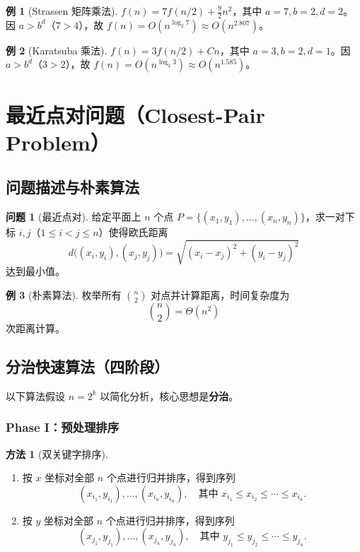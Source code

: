 \documentclass[UTF8,11pt,a4paper]{ctexbook}   %
\theoremstyle{definition}
\newtheorem{example}{例}[section]
\newtheorem{method}{方法}[section]
\newtheorem{problem}{问题}[section]
\begin{document}
\begin{example}[Strassen 矩阵乘法]
$f(n) = 7f(n/2) + \frac{9}{2}n^2$，其中 $a=7,b=2,d=2$。因 $a>b^d$（$7>4$），故 $f(n) = O(n^{\log_2 7}) \approx O(n^{2.807})$。
\end{example}

\begin{example}[Karatsuba 乘法]
$f(n) = 3f(n/2) + Cn$，其中 $a=3,b=2,d=1$。因 $a>b^d$（$3>2$），故 $f(n) = O(n^{\log_2 3}) \approx O(n^{1.585})$。
\end{example}

\section{最近点对问题（Closest-Pair Problem）}

\subsection{问题描述与朴素算法}

\begin{problem}[最近点对]
给定平面上 $n$ 个点 $P=\{(x_1,y_1),\dots,(x_n,y_n)\}$，求一对下标 $i,j$（$1\le i<j\le n$）使得欧氏距离
\[
d\bigl((x_i,y_i),(x_j,y_j)\bigr) = \sqrt{(x_i-x_j)^2+(y_i-y_j)^2}
\]
达到最小值。
\end{problem}

\begin{example}[朴素算法]
枚举所有 $\binom{n}{2}$ 对点并计算距离，时间复杂度为
\[
\binom{n}{2} = \Theta(n^2)
\]
次距离计算。
\end{example}

\subsection{分治快速算法（四阶段）}

以下算法假设 $n=2^k$ 以简化分析，核心思想是\textbf{分治}。

\subsubsection{Phase I：预处理排序}

\begin{method}[双关键字排序]
\begin{enumerate}
    \item 按 $x$ 坐标对全部 $n$ 个点进行归并排序，得到序列
    \[
    (x_{i_1},y_{i_1}),\dots,(x_{i_n},y_{i_n}),\quad\text{其中 }x_{i_1}\le x_{i_2}\le\cdots\le x_{i_n}.
    \]
    \item 按 $y$ 坐标对全部 $n$ 个点进行归并排序，得到序列
    \[
    (x_{j_1},y_{j_1}),\dots,(x_{j_n},y_{j_n}),\quad\text{其中 }y_{j_1}\le y_{j_2}\le\cdots\le y_{j_n}.
    \]
\end{enumerate}
\end{method}
\end{document}
